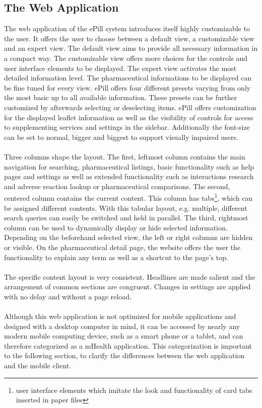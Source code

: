\subsection{The Web Application}
The web application of the ePill system introduces itself highly customizable to the user. It offers the user to choose between a default view, a customizable view and an expert view. The default view aims to provide all necessary information in a compact way. The customizable view offers more choices for the controls and user interface elements to be displayed. The expert view activates the most detailed information level. The pharmaceutical informations to be displayed can be fine tuned for every view. ePill offers four different presets varying from only the most basic up to all available information. These presets can be further customized by afterwards selecting or deselecting items. ePill offers customization for the displayed leaflet information as well as the visibility of controls for access to supplementing services and settings in the sidebar. Additionally the font-size can be set to normal, bigger and biggest to support visually impaired users.
\\
\\
Three columns shape the layout. The first, leftmost column contains the main navigation for searching, pharmaceutical listings, basic functionality such as help pages and settings as well as extended functionality such as interactions research and adverse reaction lookup or pharmaceutical comparisons. The second, centered column contains the current content. This column has tabs\footnote{user interface elements which imitate the look and functionality of card tabs inserted in paper files}, which can be assigned different contents. With this tabular layout, e.g. multiple, different search queries can easily be switched and held in parallel. The third, rightmost column can be used to dynamically display or hide selected information. Depending on the beforehand selected view, the left or right columns are hidden or visible. On the pharmaceutical detail page, the website offers the user the functionality to explain any term as well as a shortcut to the page's top.
\\
\\
The specific content layout is very consistent. Headlines are made salient and the arrangement of common sections are congruent. Changes in settings are applied with no delay and without a page reload.
\\
\\
Although this web application is not optimized for mobile applications and designed with a desktop computer in mind, it can be accessed by nearly any modern mobile computing device, such as a smart phone or a tablet, and can therefore categorized as a mHealth application. This categorization is important to the following section, to clarify the differences between the web application and the mobile client.